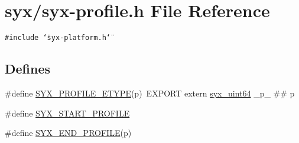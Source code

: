 \hypertarget{syx-profile_8h}{
\section{syx/syx-profile.h File Reference}
\label{syx-profile_8h}
}
{\tt \#include \char`\"{}syx-platform.h\char`\"{}}\par
\subsection*{Defines}
\begin{CompactItemize}
\item 
\#define \hyperlink{syx-profile_8h_02010071fff3c02c81c25249b1fc9481}{SYX\_\-PROFILE\_\-ETYPE}(p)~EXPORT extern \hyperlink{syx-types_8h_5a7750bec2122e7d3fccdffa19e87efe}{syx\_\-uint64} \_\-p\_\- \#\# p
\item 
\#define \hyperlink{syx-profile_8h_3b9369ab3f0b8d0366b7f97b9b2e9913}{SYX\_\-START\_\-PROFILE}
\item 
\#define \hyperlink{syx-profile_8h_6c83a6245e6bb84f65dc1d0471656ccf}{SYX\_\-END\_\-PROFILE}(p)
\end{CompactItemize}
